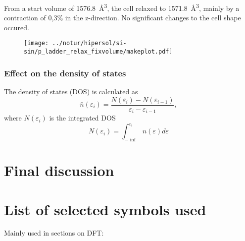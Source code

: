 \documentclass[11pt,bibliography=totoc,index=totoc]{scrbook}   %
\begin{document}
From a start volume of \SI{1576.8}{\angstrom\cubed}, the cell relaxed to \SI{1571.8}{\angstrom\cubed}, mainly by a contraction of 0,3\% in the z-direction. No significant changes to the cell shape occured.

\begin{figure}[htp]
  \centering
  \texttt{[image: ../notur/hipersol/si-sin/p\_ladder\_relax\_fixvolume/makeplot.pdf]}
  \caption{}
  \label{fig:nome}
\end{figure}


\subsection{Effect on the density of states}

The density of states (DOS) is calculated as
\begin{equation}
    \bar{n}(\varepsilon_i) = \frac{N(\varepsilon_i) - N(\varepsilon_{i-1})}{\varepsilon_i - \varepsilon_{i-1}},
\end{equation}
where $N(\varepsilon_i)$ is the integrated DOS
\begin{equation}
    N(\varepsilon_i) = \int_{-\inf}^{\varepsilon_i} n(\varepsilon) d\varepsilon
\end{equation}


\chapter{Final discussion}


\printbibliography

\appendix
\chapter{List of selected symbols used}
  Mainly used in sections on DFT:
\end{document}
